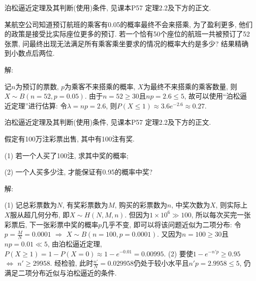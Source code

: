 \documentclass[standard]{ExBook}
\renewenvironment{shaded}{%
  \def\FrameCommand{\fboxsep=\FrameSep \colorbox{shadecolor}}%
  \MakeFramed{\advance\hsize-\width \FrameRestore}%
}{%
  \endMakeFramed
}
\begin{document}
\begin{qitems}
\textcolor{themeColor}{\selectfont {} 泊松逼近定理及其判断(使用)条件, 见课本P57 定理2.2及下方的正文.}

\vspace{2.5cm-5em}

    \begin{bbox}
    \begin{shaded}
        \qitem
某航空公司知道预订航班的乘客有0.05的概率最终不会来搭乘, 为了盈利更多, 他们的政策是接受比实际座位更多的预订. 若一个恰有50个座位的航班一共被预订了52张票, 问最终出现无法满足所有乘客乘坐要求的情况的概率大约是多少? 结果精确到小数点后两位.
    \end{shaded}
    \end{bbox}

\vspace{\dimexpr2.5cm-5em\relax}

解: 

记$n$为预订的票数, $p$为乘客不来搭乘的概率, $X$为最终不来搭乘的乘客数量, 则$X\sim B(n=52,p=0.05)$. 由于$n=52\geq30$且$np=2.6 \leq 5$, 故可以使用``泊松逼近定理''进行估算: 令$\lambda=np=2.6$, 则$P(X \leq 1)\approx3.6e^{-2.6}\approx0.27$.

\textcolor{themeColor}{\selectfont {} 泊松逼近定理及其判断(使用)条件, 见课本P57 定理2.2及下方的正文.}

\vspace{2.5cm-5em}

    \begin{bbox}
    \begin{shaded}
        \qitem
假定有100万注彩票出售, 其中有100注有奖.

(1) 若一个人买了100注, 求其中奖的概率;

(2) 一个人买多少注, 才能保证有0.95的概率中奖?
    \end{shaded}
    \end{bbox}

\vspace{\dimexpr2.5cm-5em\relax}

解: 

(1) 记总彩票数为$N$, 有奖彩票数为$M$, 购买的彩票数为$n$, 中奖次数为$X$, 则实际上$X$服从超几何分布, 即$X\sim H(N,M,n)$. 但因为$1\times10^{6}\gg100$, 所以每次买完一张彩票后, 下一张彩票中奖的概率$p$几乎不变, 即可以将该问题近似为二项分布: 令$p=\frac{M}{N}=0.0001$ $\Longrightarrow$ $X\sim B(n=100,p=0.0001)$. 又因为$n=100\geq 30$且$np=0.01\ll5$, 由泊松逼近定理, $P(X \geq 1)=1-P(X=0)\approx1-e^{-0.01}=0.00995$.
(2) 要使$1-e^{-n'p}\geq0.95$ $\Longleftrightarrow$ $n'\geq29958$. 经检验, 此时$\frac{n'}{N}=0.029958$仍处于较小水平且$n'p=2.9958 \leq 5$, 仍满足二项分布近似与泊松逼近的条件.


\end{qitems}
\end{document}
